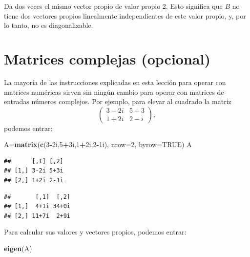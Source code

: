 \documentclass[]{book}
\newenvironment{Shaded}{\begin{snugshade}}{\end{snugshade}}
\newcommand{\DataTypeTok}[1]{\textcolor[rgb]{0.13,0.29,0.53}{#1}}
\newcommand{\DecValTok}[1]{\textcolor[rgb]{0.00,0.00,0.81}{#1}}
\newcommand{\KeywordTok}[1]{\textcolor[rgb]{0.13,0.29,0.53}{\textbf{#1}}}
\newcommand{\NormalTok}[1]{#1}
\newcommand{\OperatorTok}[1]{\textcolor[rgb]{0.81,0.36,0.00}{\textbf{#1}}}
\newcommand{\OtherTok}[1]{\textcolor[rgb]{0.56,0.35,0.01}{#1}}
\theoremstyle{definition}
\theoremstyle{definition}
\theoremstyle{definition}
\theoremstyle{remark}
\begin{document}
Da dos veces el mismo vector propio de valor propio 2. Esto significa que \(B\) no tiene dos vectores propios linealmente independientes de este valor propio, y, por lo tanto, no es diagonalizable.

\hypertarget{matrices-complejas-opcional}{%
\section{Matrices complejas (opcional)}\label{matrices-complejas-opcional}}

La mayoría de las instrucciones explicadas en esta lección para operar con matrices numéricas sirven sin ningún cambio para operar con matrices de entradas números complejos. Por ejemplo, para elevar al cuadrado la matriz
\[
\left( \begin{array}{cc} 3-2i & 5+3\\ 1+2i & 2-i \end{array}
\right),
\]
podemos entrar:

\begin{Shaded}
\begin{Highlighting}[]
\NormalTok{A=}\KeywordTok{matrix}\NormalTok{(}\KeywordTok{c}\NormalTok{(}\DecValTok{3}\OperatorTok{-}\NormalTok{2i,}\DecValTok{5}\OperatorTok{+}\NormalTok{3i,}\DecValTok{1}\OperatorTok{+}\NormalTok{2i,}\DecValTok{2}\OperatorTok{-}\NormalTok{1i), }\DataTypeTok{nrow=}\DecValTok{2}\NormalTok{, }\DataTypeTok{byrow=}\OtherTok{TRUE}\NormalTok{)}
\NormalTok{A}
\end{Highlighting}
\end{Shaded}

\begin{verbatim}
##      [,1] [,2]
## [1,] 3-2i 5+3i
## [2,] 1+2i 2-1i
\end{verbatim}

\begin{Shaded}
\end{Shaded}

\begin{verbatim}
##       [,1]  [,2]
## [1,]  4+1i 34+0i
## [2,] 11+7i  2+9i
\end{verbatim}

Para calcular sus valores y vectores propios, podemos entrar:

\begin{Shaded}
\begin{Highlighting}[]
\KeywordTok{eigen}\NormalTok{(A)}
\end{Highlighting}
\end{Shaded}
\end{document}
